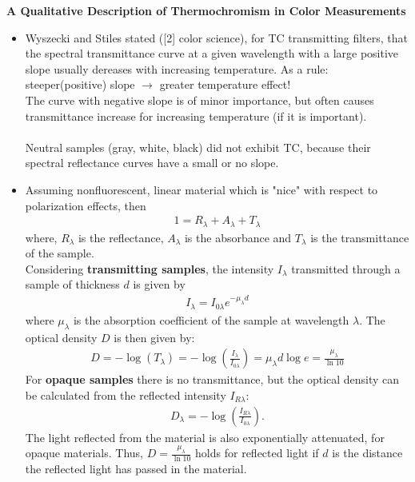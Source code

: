 \newpage
\cite{TCqualitativeDescription} 
\textbf{A Qualitative Description of Thermochromism in Color Measurements} \\
\begin{itemize}
\item Wyszecki and Stiles stated ([2] color science), for TC transmitting filters, that the spectral
   transmittance curve at a given wavelength with a large positive slope usually dereases with increasing
   temperature. As a rule: steeper(positive) slope $\rightarrow$ greater temperature effect! \\
   The curve with negative slope is of minor importance, but often causes transmittance increase for
   increasing temperature (if it is important). \\
   \\
   Neutral samples (gray, white, black) did not exhibit TC, because their spectral reflectance curves
   have a small or no slope.
\item Assuming nonfluorescent, linear material which is "nice" with respect to polarization effects, then
   \begin{align*}
      1 = R_{\lambda} + A_{\lambda} + T_{\lambda}
   \end{align*}
   where, $R_{\lambda}$ is the reflectance, $A_{\lambda}$ is the absorbance and $T_{\lambda}$ is the
   transmittance of the sample.\\
   Considering \textbf{transmitting samples}, the intensity $I_{\lambda}$ transmitted through a 
   sample of thickness $d$ is given by
   \begin{align*}
      I_{\lambda} = I_{0 \lambda} e^{- \mu_{\lambda} d}
   \end{align*}
   where $\mu_{\lambda}$ is the absorption coefficient of the sample at wavelength $\lambda$.
   The optical density $D$ is then given by:
   \begin{align*}
      D = -\log(T_{\lambda}) = -\log(\frac{I_{\lambda}}{I_{0\lambda}}) = \mu_{\lambda} d \log e
      = \frac{\mu_{\lambda}}{\ln 10}
   \end{align*}
   For \textbf{opaque samples} there is no transmittance, but the optical density can be calculated
   from the reflected intensity $I_{R\lambda}$:
   \begin{align*}
      D_{\lambda} = -\log(\frac{I_{R\lambda}}{I_{0\lambda}}).
   \end{align*}
   The light reflected from the material is also exponentially attenuated, for opaque materials.
   Thus, $D=\frac{\mu_{\lambda}}{\ln 10}$ holds for reflected light if $d$ is the distance the
   reflected light has passed in the material.
\end{itemize}


